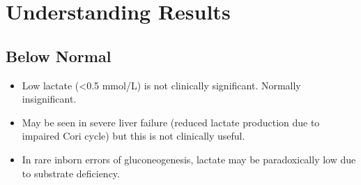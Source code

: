 \section*{Understanding Results}

\subsection*{Below Normal}
\begin{itemize}
  \item Low lactate (<0.5 mmol/L) is not clinically significant. Normally insignificant.
  \item May be seen in severe liver failure (reduced lactate production due to impaired Cori cycle) but this is not clinically useful.
  \item In rare inborn errors of gluconeogenesis, lactate may be paradoxically low due to substrate deficiency.
\end{itemize}

